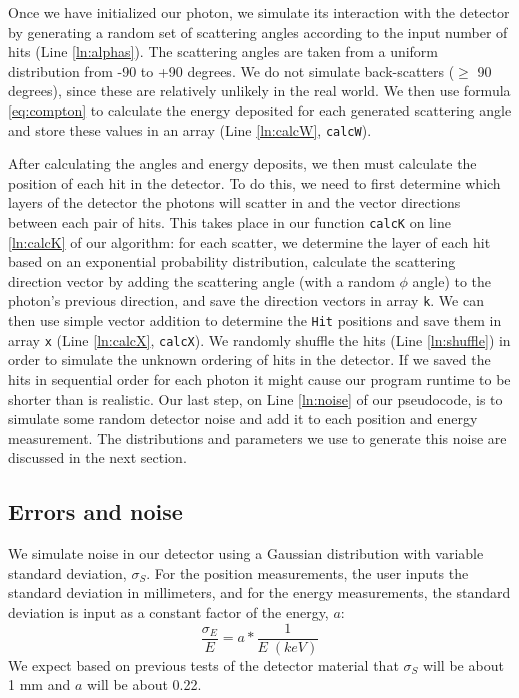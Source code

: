 Once we have initialized our photon, we simulate its interaction with the detector by generating a random set of scattering angles according to the input number of hits (Line \ref{ln:alphas}). The scattering angles are taken from a uniform distribution from -90 to +90 degrees. We do not simulate back-scatters ($\geq$ 90 degrees), since these are relatively unlikely in the real world. We then use formula \ref{eq:compton} to calculate the energy deposited for each generated scattering angle and store these values in an array (Line \ref{ln:calcW}, \texttt{calcW}).

After calculating the angles and energy deposits, we then must calculate the position of each hit in the detector. To do this, we need to first determine which layers of the detector the photons will scatter in and the vector directions between each pair of hits. This takes place in our function \texttt{calcK} on line \ref{ln:calcK} of our algorithm: for each scatter, we determine the layer of each hit based on an exponential probability distribution, calculate the scattering direction vector by adding the scattering angle (with a random $\phi$ angle) to the photon's previous direction, and save the direction vectors in array \texttt{k}. We can then use simple vector addition to determine the \texttt{Hit} positions and save them in array \texttt{x} (Line \ref{ln:calcX}, \texttt{calcX}). We randomly shuffle the hits (Line \ref{ln:shuffle}) in order to simulate the unknown ordering of hits in the detector. If we saved the hits in sequential order for each photon it might cause our program runtime to be shorter than is realistic. Our last step, on Line \ref{ln:noise} of our pseudocode, is to simulate some random detector noise and add it to each position and energy measurement. The distributions and parameters we use to generate this noise are discussed in the next section.

\subsection{Errors and noise} \label{noise}
We simulate noise in our detector using a Gaussian distribution with variable standard deviation, $\sigma_S$. For the position measurements, the user inputs the standard deviation in millimeters, and for the energy measurements, the standard deviation is input as a constant factor of the energy, $a$:
\begin{equation}\label{eq:sigE}
\frac{\sigma_E}{E} = a*\frac{1}{E \; (keV)}
\end{equation}
We expect based on previous tests of the detector material that $\sigma_S$ will be about 1 mm and $a$ will be about 0.22.

